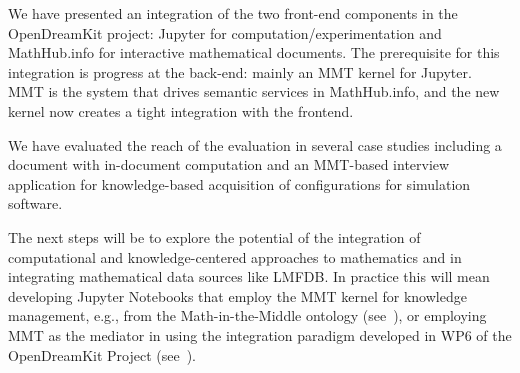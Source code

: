 We have presented an integration of the two front-end components in the OpenDreamKit project:
Jupyter for computation/experimentation and MathHub.info for interactive mathematical documents.
The prerequisite for this integration is progress at the back-end: mainly an MMT kernel for Jupyter.
MMT is the system that drives semantic services in MathHub.info, and the new kernel now creates a tight integration with the frontend.

We have evaluated the reach of the evaluation in several case studies including a document with in-document computation and an MMT-based interview application for knowledge-based acquisition of configurations for simulation software.

The next steps will be to explore the potential of the integration of computational and knowledge-centered approaches to mathematics and in integrating mathematical data sources like LMFDB.
In practice this will mean developing Jupyter Notebooks that employ the MMT kernel for knowledge management, e.g., from the Math-in-the-Middle ontology (see~\cite{ODK-D6.8}), or employing MMT as the mediator in using the integration paradigm developed in WP6 of the OpenDreamKit Project (see~\cite{ODK-D6.5}).



